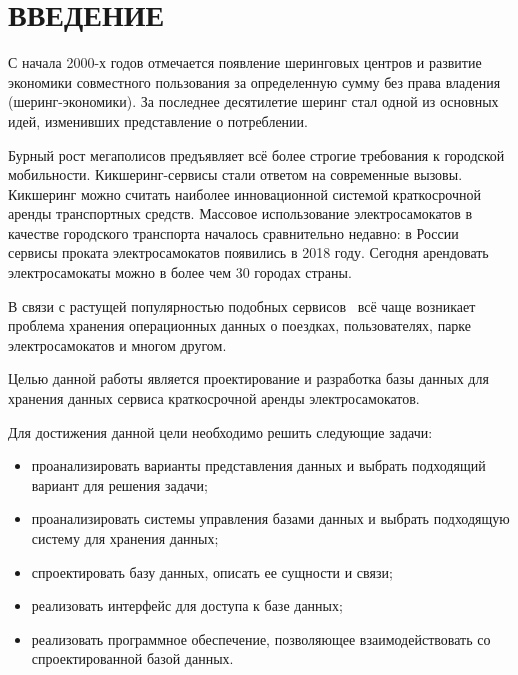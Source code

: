 \chapter*{ВВЕДЕНИЕ}

С начала 2000-х годов отмечается появление шеринговых центров и развитие экономики совместного пользования за определенную сумму без права владения  (шеринг-экономики). За последнее десятилетие шеринг стал одной из основных идей, изменивших представление о потреблении.

Бурный рост мегаполисов предъявляет всё более строгие требования к городской мобильности. Кикшеринг-сервисы стали ответом на современные вызовы. Кикшеринг можно считать наиболее инновационной системой краткосрочной аренды транспортных средств. Массовое использование электросамокатов в качестве городского транспорта началось сравнительно недавно: в России сервисы проката электросамокатов появились в 2018 году. Сегодня арендовать электросамокаты можно в более чем 30 городах страны.

В связи с растущей популярностью подобных сервисов~\cite{popularity} всё чаще возникает проблема хранения операционных данных о поездках, пользователях, парке электросамокатов и многом другом.

Целью данной работы является проектирование и разработка базы данных для хранения данных сервиса краткосрочной аренды электросамокатов.

Для достижения данной цели необходимо решить следующие задачи:

\begin{itemize}
    \item проанализировать варианты представления данных и выбрать подходящий вариант для решения задачи;
    \item проанализировать системы управления базами данных и выбрать подходящую систему для хранения данных;
    \item спроектировать базу данных, описать ее сущности и связи;
    \item реализовать интерфейс для доступа к базе данных;
    \item реализовать программное обеспечение, позволяющее взаимодействовать со спроектированной базой данных.
\end{itemize}